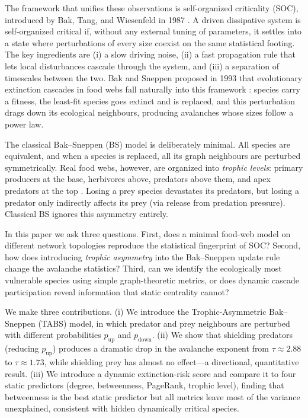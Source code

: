 \documentclass[11pt,a4paper]{article}
\begin{document}
The framework that unifies these observations is self-organized criticality (SOC), introduced by Bak, Tang, and Wiesenfeld in 1987 \citep{bak1987self,bak1996how}. A driven dissipative system is self-organized critical if, without any external tuning of parameters, it settles into a state where perturbations of every size coexist on the same statistical footing. The key ingredients are (i) a slow driving noise, (ii) a fast propagation rule that lets local disturbances cascade through the system, and (iii) a separation of timescales between the two. Bak and Sneppen proposed in 1993 that evolutionary extinction cascades in food webs fall naturally into this framework \citep{bak1993punctuated}: species carry a fitness, the least-fit species goes extinct and is replaced, and this perturbation drags down its ecological neighbours, producing avalanches whose sizes follow a power law.

The classical Bak--Sneppen (BS) model is deliberately minimal. All species are equivalent, and when a species is replaced, all its graph neighbours are perturbed symmetrically. Real food webs, however, are organized into \emph{trophic levels}: primary producers at the base, herbivores above, predators above them, and apex predators at the top \citep{dunne2002foodweb}. Losing a prey species devastates its predators, but losing a predator only indirectly affects its prey (via release from predation pressure). Classical BS ignores this asymmetry entirely.

In this paper we ask three questions. First, does a minimal food-web model on different network topologies reproduce the statistical fingerprint of SOC? Second, how does introducing \emph{trophic asymmetry} into the Bak--Sneppen update rule change the avalanche statistics? Third, can we identify the ecologically most vulnerable species using simple graph-theoretic metrics, or does dynamic cascade participation reveal information that static centrality cannot?

We make three contributions. (i) We introduce the Trophic-Asymmetric Bak--Sneppen (TABS) model, in which predator and prey neighbours are perturbed with different probabilities $p_{\text{up}}$ and $p_{\text{down}}$. (ii) We show that shielding predators (reducing $p_{\text{up}}$) produces a dramatic drop in the avalanche exponent from $\tau \approx 2.88$ to $\tau \approx 1.73$, while shielding prey has almost no effect---a directional, quantitative result. (iii) We introduce a dynamic extinction-risk score and compare it to four static predictors (degree, betweenness, PageRank, trophic level), finding that betweenness is the best static predictor but all metrics leave most of the variance unexplained, consistent with hidden dynamically critical species.
\end{document}
